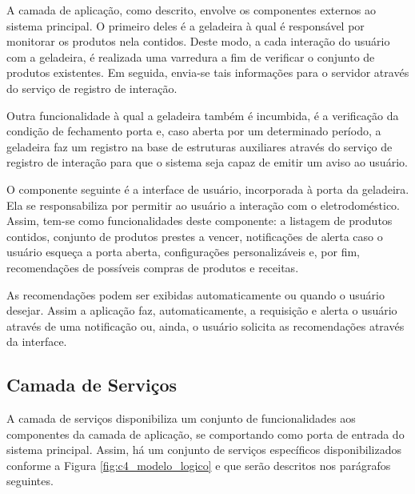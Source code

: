 
A camada de aplicação, como descrito, envolve os componentes  externos ao sistema principal. O primeiro deles é a geladeira à qual é responsável por monitorar os produtos nela contidos. Deste modo, a cada interação do usuário com a geladeira, é realizada uma varredura a fim de verificar o conjunto de produtos existentes. Em seguida, envia-se tais informações para o servidor através do serviço de registro de interação.

Outra funcionalidade à qual a geladeira também é incumbida, é a verificação da condição de fechamento porta e, caso aberta por um determinado período, a geladeira faz um registro na base de estruturas auxiliares através do serviço de registro de interação para que o sistema seja capaz de emitir um aviso ao usuário.


O componente seguinte é a interface de usuário, incorporada à porta da geladeira. Ela se responsabiliza por permitir ao usuário a interação com o eletrodoméstico. Assim, tem-se como funcionalidades deste componente: a listagem de produtos contidos, conjunto de produtos prestes a vencer, notificações de alerta caso o usuário esqueça a porta aberta, configurações personalizáveis e, por fim, recomendações de possíveis compras de produtos e receitas.

As recomendações podem ser exibidas automaticamente ou quando o usuário desejar. Assim a aplicação faz, automaticamente, a requisição e alerta o usuário através de uma notificação ou, ainda, o usuário solicita as recomendações através da interface.





\subsection{Camada de Serviços}

A camada de serviços disponibiliza um conjunto de funcionalidades aos componentes da camada de aplicação, se comportando como porta de entrada do sistema principal. Assim, há um conjunto de serviços específicos disponibilizados conforme a Figura \ref{fig:c4_modelo_logico} e que serão descritos nos parágrafos seguintes.

